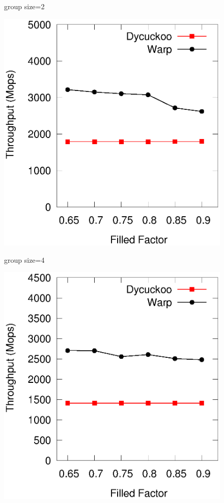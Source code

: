 \begin{figure}[htp]
\begin{minipage}{0.16\linewidth}
		\centerline{group size=2}
	\end{minipage}
	\begin{minipage}{0.16\linewidth}\centering
		\includegraphics[width=\linewidth]{pic/group-size/g4-search.eps}
		\centerline{group size=4}
	\end{minipage}
	\begin{minipage}{0.16\linewidth}\centering
		\includegraphics[width=\linewidth]{pic/group-size/g8-search.eps}

\end{minipage}
\end{figure}
